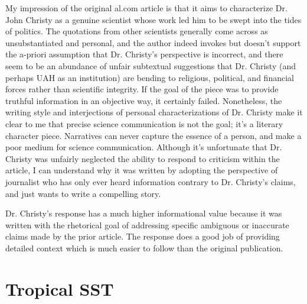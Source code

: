 \documentclass[12pt]{article}
\begin{document}
My impression of the original al.com article is that it aims to characterize Dr. John Christy as a genuine scientist whose work led him to be swept into the tides of politics. The quotations from other scientists generally come across as unsubstantiated and personal, and the author indeed invokes but doesn't support the a-priori assumption that Dr. Christy's perspective is incorrect, and there seem to be an abundance of unfair subtextual suggestions that Dr. Christy (and perhaps UAH as an institution) are bending to religious, political, and financial forces rather than scientific integrity. If the goal of the piece was to provide truthful information in an objective way, it certainly failed. Nonetheless, the writing style and interjections of personal characterizations of Dr. Christy make it clear to me that precise science communication is not the goal; it's a literary character piece. Narratives can never capture the essence of a person, and make a poor medium for science communication. Although it's unfortunate that Dr. Christy was unfairly neglected the ability to respond to criticism within the article, I can understand why it was written by adopting the perspective of journalist who has only ever heard information contrary to Dr. Christy's claims, and just wants to write a compelling story.

Dr. Christy's response has a much higher informational value because it was written with the rhetorical goal of addressing specific ambiguous or inaccurate claims made by the prior article. The response does a good job of providing detailed context which is much easier to follow than the original publication.

\section{Tropical SST}
\end{document}
